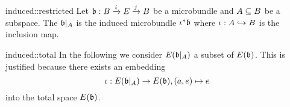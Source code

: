 \begin{myparagraph}
    
\end{myparagraph}

\begin{myexample}{induced::restricted}    
    Let $\bb: \bundle{B}{E}{i}{j}$ be a microbundle and $A \sub B$ be a subspace.
    The  $\bb\restr{A}$ is the induced microbundle $\iota^*\bb$ where $\iota: A \incl B$ is the inclusion map.
\end{myexample}

\begin{remark}{induced::total}
    In the following we consider $E(\bb\restr{A})$ a subset of $E(\bb)$.
    This is justified because there exists an embedding
    \[ \iota: E(\bb\restr{A}) \to E(\bb), (a, e) \mapsto e \]
    into the total space $E(\bb)$.
\end{remark}